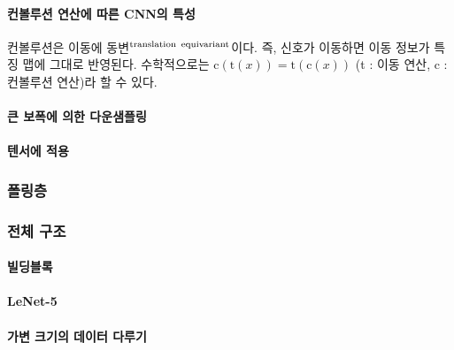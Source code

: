 \documentclass [12pt] {oblivoir}
\let\oldsubsubsection=\subsubsection
\renewcommand{\subsubsection}
{
  \filbreak
  \oldsubsubsection
}
\begin{document}
\vspace{3mm}

\paragraph*{컨볼루션 연산에 따른 CNN의 특성}\mbox{}

\vspace{3mm}

컨볼루션은 이동에 동변$^{\text{translation\, equivariant}}$이다. 즉, 신호가 이동하면 이동 정보가 특징 맵에 그대로 반영된다. 수학적으로는 $\text{c}(\text{t}(x)) = \text{t}(\text{c}(x))$ (t : 이동 연산, c : 컨볼루션 연산)라 할 수 있다.

\paragraph*{큰 보폭에 의한 다운샘플링}\mbox{}

\vspace{3mm}

\paragraph*{텐서에 적용}\mbox{}

\vspace{3mm}

\subsubsection{폴링층}

\subsubsection{전체 구조}

\paragraph*{빌딩블록}\mbox{}

\vspace{3mm}

\paragraph*{LeNet-5}\mbox{}

\vspace{3mm}

\paragraph*{가변 크기의 데이터 다루기}\mbox{}
\end{document}
